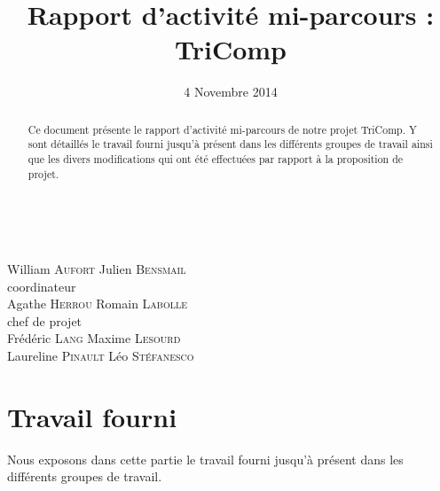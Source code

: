 \documentclass{article}
\title{Rapport d'activité mi-parcours : TriComp}
\author{}
\date{4 Novembre 2014}
\begin{document}
\makeatletter %
  \begin{titlepage}
    \begin{center}
       {\LARGE \@title} \\
       \vspace{2cm}
       {\large \@date}
       \vspace{3cm}
    \end{center}
       {\large
       {William \textsc{Aufort} \hfill Julien \textsc{Bensmail} \\}
    \vspace{1cm}
       {\hfill coordinateur \\}
       {Agathe \textsc{Herrou}  \hfill Romain \textsc{Labolle} \\}
       \vspace{1cm}
       {chef de projet \\}
       \vspace{1.5cm}
       {Frédéric \textsc{Lang} \hfill Maxime \textsc{Lesourd} \\}
       {Laureline \textsc{Pinault} \hfill Léo \textsc{Stéfanesco} \\}}
       \vspace{2.5cm}
    \begin{abstract}
	Ce document présente le rapport d'activité mi-parcours de notre projet TriComp. Y sont détaillés le travail fourni jusqu'à présent 
dans les différents groupes de travail ainsi que les divers modifications qui ont été effectuées par rapport à la proposition de projet.
    \end{abstract}
  \end{titlepage}
\makeatother


\newpage

\tableofcontents

\newpage


\section{Travail fourni}

Nous exposons dans cette partie le travail fourni jusqu'à présent dans les différents groupes de travail.
\end{document}
